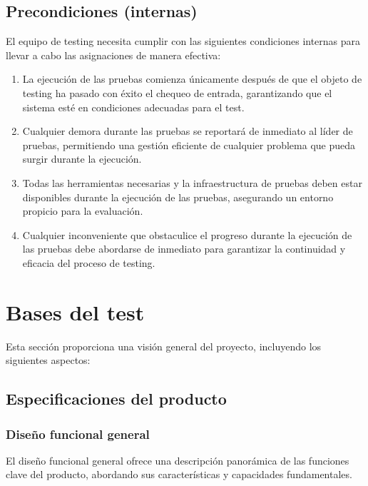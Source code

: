 \documentclass[12pt,a4paper, twoside]{article} %
\begin{document}
\subsection{Precondiciones (internas)}
\label{sec:requisitos-especificos}

El equipo de testing necesita cumplir con las siguientes condiciones internas para llevar a cabo las asignaciones de manera efectiva:

\begin{enumerate}
\item La ejecución de las pruebas comienza únicamente después de que el objeto de testing ha pasado con éxito el chequeo de entrada, garantizando que el sistema esté en condiciones adecuadas para el test.

\item Cualquier demora durante las pruebas se reportará de inmediato al líder de pruebas, permitiendo una gestión eficiente de cualquier problema que pueda surgir durante la ejecución.

\item Todas las herramientas necesarias y la infraestructura de pruebas deben estar disponibles durante la ejecución de las pruebas, asegurando un entorno propicio para la evaluación.

\item Cualquier inconveniente que obstaculice el progreso durante la ejecución de las pruebas debe abordarse de inmediato para garantizar la continuidad y eficacia del proceso de testing.

\end{enumerate}


\section{Bases del test}
\label{sec:orgc1c4017}

Esta sección proporciona una visión general del proyecto, incluyendo los siguientes aspectos:


\subsection{Especificaciones del producto}
\subsubsection{Diseño funcional general}

El diseño funcional general ofrece una descripción panorámica de las funciones clave del producto, abordando sus características y capacidades fundamentales.
\end{document}
